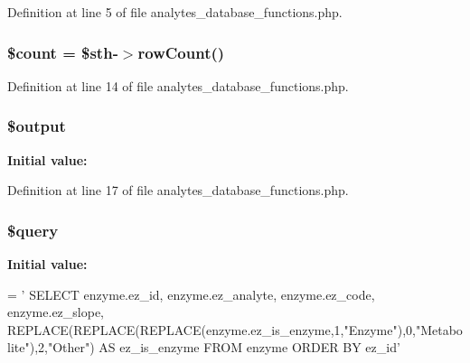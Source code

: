 Definition at line 5 of file analytes\-\_\-database\-\_\-functions.\-php.

\hypertarget{analytes__database__functions_8php_af789423037bbc89dc7c850e761177570}{
\subsubsection[{\$count}]{\setlength{\rightskip}{0pt plus 5cm}\$count = \$sth-\/$>$row\-Count()}}\label{analytes__database__functions_8php_af789423037bbc89dc7c850e761177570}


Definition at line 14 of file analytes\-\_\-database\-\_\-functions.\-php.

\hypertarget{analytes__database__functions_8php_a73004ce9cd673c1bfafd1dc351134797}{
\subsubsection[{\$output}]{\setlength{\rightskip}{0pt plus 5cm}\$output}}\label{analytes__database__functions_8php_a73004ce9cd673c1bfafd1dc351134797}
{\bfseries Initial value\-:}


Definition at line 17 of file analytes\-\_\-database\-\_\-functions.\-php.

\hypertarget{analytes__database__functions_8php_af59a5f7cd609e592c41dc3643efd3c98}{
\subsubsection[{\$query}]{\setlength{\rightskip}{0pt plus 5cm}\$query}}\label{analytes__database__functions_8php_af59a5f7cd609e592c41dc3643efd3c98}
{\bfseries Initial value\-:}
\begin{DoxyCode}
= \textcolor{stringliteral}{'}
\textcolor{stringliteral}{    SELECT enzyme.ez\_id, enzyme.ez\_analyte, enzyme.ez\_code, enzyme.ez\_slope,
       REPLACE(REPLACE(REPLACE(enzyme.ez\_is\_enzyme,1,"Enzyme"),0,"Metabolite"),2,"Other") AS ez\_is\_enzyme}
\textcolor{stringliteral}{    FROM enzyme}
\textcolor{stringliteral}{    ORDER BY ez\_id'}
\end{DoxyCode}


